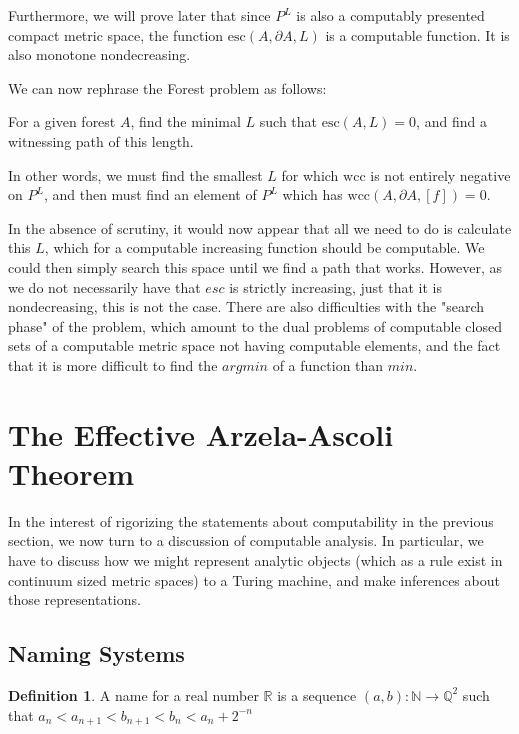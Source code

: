 \documentclass[10pt,a4paper]{article}
\theoremstyle{definition}
\newtheorem{dfn}[thm]{Definition}
\newcommand{\N}{\mathbb{N}}
\def\Q{\mathbb{Q}}
\def\R{\mathbb{R}}
\begin{document}
Furthermore, we will prove later that since $P^L$ is also a computably presented compact metric space, the function $\mathrm{esc}(A,\partial A, L)$ is a computable function. It is also monotone nondecreasing.

We can now rephrase the Forest problem as follows:

\begin{center}
    For a given forest $A$, find the minimal $L$ such that $\mathrm{esc}(A,L) = 0$, and find a witnessing path of this length.
\end{center}

In other words, we must find the smallest $L$ for which $\mathrm{wcc}$ is not entirely negative on $P^{L}$, and then must find an element of $P^L$ which has $\mathrm{wcc}(A,\partial A,[f]) = 0$.

In the absence of scrutiny, it would now appear that all we need to do is calculate this $L$, which for a computable increasing function should be computable. We could then simply search this space until we find a path that works. However, as we do not necessarily have that $esc$ is strictly increasing, just that it is nondecreasing, this is not the case. There are also difficulties with the "search phase" of the problem, which amount to the dual problems of computable closed sets of a computable metric space not having computable elements, and the fact that it is more difficult to find the $argmin$ of a function than $min$.

\section{The Effective Arzela-Ascoli Theorem}
\label{sec:three}
In the interest of rigorizing the statements about computability in the previous section, we now turn to a discussion of computable analysis. In particular, we have to discuss how we might represent analytic objects (which as a rule exist in continuum sized metric spaces) to a Turing machine, and make inferences about those representations.

\subsection{Naming Systems}
\label{sec:naming}
\begin{dfn}
    A name for a real number $\R$ is a sequence $(a,b):\N\rightarrow \Q^2$ such that $a_n < a_{n+1} < b_{n+1} < b_n < a_{n}+2^{-n} $
\end{dfn}
\label{dfn:names}
\end{document}
